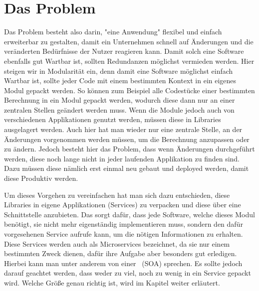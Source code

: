 \section{Das Problem}
Das Problem besteht also darin, "eine Anwendung" flexibel und einfach erweiterbar zu gestalten, damit ein Unternehmen schnell auf Änderungen und die veränderten Bedürfnisse der Nutzer reagieren kann. Damit solch eine Software ebenfalls gut Wartbar ist, sollten Redundanzen möglichst vermieden werden. Hier steigen wir in Modularität ein, denn damit eine Software möglichst einfach Wartbar ist, sollte jeder Code mit einem bestimmten Kontext in ein eigenes Modul gepackt werden. So können zum Beispiel alle Codestücke einer bestimmten Berechnung in ein Modul gepackt werden, wodurch diese dann nur an einer zentralen Stellen geändert werden muss. Wenn die Module jedoch auch von verschiedenen Applikationen genutzt werden, müssen diese in Libraries ausgelagert werden. Auch hier hat man wieder nur eine zentrale Stelle, an der Änderungen vorgenommen werden müssen, um die Berechnung anzupassen oder zu ändern. Jedoch besteht hier das Problem, dass wenn Änderungen durchgeführt werden, diese noch lange nicht in jeder laufenden Applikation zu finden sind. Dazu müssen diese nämlich erst einmal neu gebaut und deployed werden, damit diese Produktiv werden.

Um dieses Vorgehen zu vereinfachen hat man sich dazu entschieden, diese Libraries in eigene Applikationen (Services) zu verpacken und diese über eine Schnittstelle anzubieten. Das sorgt dafür, dass jede Software, welche dieses Modul benötigt, sie nicht mehr eigenständig implementieren muss, sondern den dafür vorgesehenen Service aufrufe kann, um die nötigen Informationen zu erhalten. Diese Services werden auch als Microservices bezeichnet, da sie nur einem bestimmten Zweck dienen, dafür ihre Aufgabe aber besonders gut erledigen. Hierbei kann man unter anderem von einer \SOA\ (SOA) sprechen. Es sollte jedoch darauf geachtet werden, dass weder zu viel, noch zu wenig in ein Service gepackt wird. Welche Größe genau richtig ist, wird im Kapitel  weiter erläutert.
